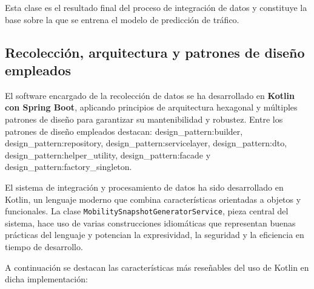 Esta clase es el resultado final del proceso de integración de datos y constituye la base sobre la que se entrena el modelo de predicción de tráfico.

\subsection{Recolección, arquitectura y patrones de diseño empleados}

El software encargado de la recolección de datos se ha desarrollado en \textbf{Kotlin con Spring Boot}, aplicando principios de arquitectura hexagonal y múltiples patrones de diseño para garantizar su mantenibilidad y robustez. Entre los patrones de diseño empleados destacan: \gls{design_pattern:builder}, \gls{design_pattern:repository}, \gls{design_pattern:servicelayer}, \gls{design_pattern:dto}, \gls{design_pattern:helper_utility}, \gls{design_pattern:facade} y \gls{design_pattern:factory_singleton}.

El sistema de integración y procesamiento de datos ha sido desarrollado en Kotlin, un lenguaje moderno que combina características orientadas a objetos y funcionales. La clase \texttt{MobilitySnapshotGeneratorService}, pieza central del sistema, hace uso de varias construcciones idiomáticas que representan buenas prácticas del lenguaje y potencian la expresividad, la seguridad y la eficiencia en tiempo de desarrollo.

A continuación se destacan las características más reseñables del uso de Kotlin en dicha implementación:

